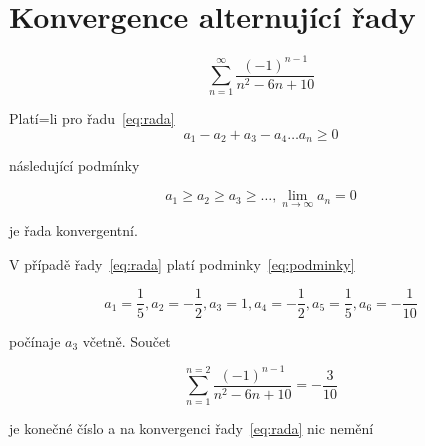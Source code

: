 \documentclass[12pt]{article}
\begin{document}
    \section{Konvergence alternující řady}\label{sec:linalg}

    \begin{equation}
        \label{eq:rada}
        \sum_{n = 1}^{\infty}\frac{(-1)^{n-1}}{n^2 -6 n + 10}
    \end{equation}

    Platí=li pro řadu~\eqref{eq:rada}
    \[a_1 - a_2 + a_3 -a_4 \dots a_n \geq 0\]

    následující podmínky

    \begin{equation}
        \label{eq:podminky}
        a_1\geq a_2 \geq a_3 \geq \dots, \lim_{n \to \infty} a_n = 0
    \end{equation}

    je řada konvergentní.

    V případě řady~\eqref{eq:rada} platí podminky~\eqref{eq:podminky}

    \[a_1 = \frac{1}{5}, a_2 = -\frac{1}{2}, a_3 = 1, a_4=-\frac{1}{2}, a_5=\frac{1}{5}, a_6 = -\frac{1}{10}\]

    počínaje $a_3$ včetně. Součet

    \begin{equation}\label{eq:rada3}
        \sum_{n = 1}^{n=2}\frac{(-1)^{n-1}}{n^2 -6 n + 10} = -\frac{3}{10}
    \end{equation}

    je konečné číslo a na konvergenci řady~\eqref{eq:rada} nic nemění
\end{document}
